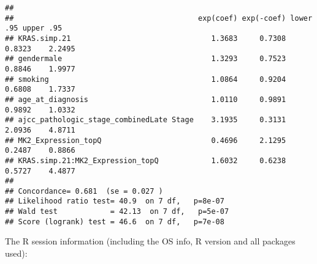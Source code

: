\documentclass{article}\usepackage[]{graphicx}\usepackage[]{color}
\makeatletter
\newenvironment{kframe}{%
 \def\at@end@of@kframe{}%
 \ifinner\ifhmode%
  \def\at@end@of@kframe{\end{minipage}}%
  \begin{minipage}{\columnwidth}%
 \fi\fi%
 \def\FrameCommand##1{\hskip\@totalleftmargin \hskip-\fboxsep
 \colorbox{shadecolor}{##1}\hskip-\fboxsep
     \hskip-\linewidth \hskip-\@totalleftmargin \hskip\columnwidth}%
 \MakeFramed {\advance\hsize-\width
   \@totalleftmargin\z@ \linewidth\hsize
   \@setminipage}}%
 {\par\unskip\endMakeFramed%
 \at@end@of@kframe}
\newenvironment{knitrout}{}{} %
\makeatother
\begin{document}
\begin{knitrout}
\begin{kframe}
\begin{verbatim}
## 
##                                          exp(coef) exp(-coef) lower .95 upper .95
## KRAS.simp.21                                1.3683     0.7308    0.8323    2.2495
## gendermale                                  1.3293     0.7523    0.8846    1.9977
## smoking                                     1.0864     0.9204    0.6808    1.7337
## age_at_diagnosis                            1.0110     0.9891    0.9892    1.0332
## ajcc_pathologic_stage_combinedLate Stage    3.1935     0.3131    2.0936    4.8711
## MK2_Expression_topQ                         0.4696     2.1295    0.2487    0.8866
## KRAS.simp.21:MK2_Expression_topQ            1.6032     0.6238    0.5727    4.4877
## 
## Concordance= 0.681  (se = 0.027 )
## Likelihood ratio test= 40.9  on 7 df,   p=8e-07
## Wald test            = 42.13  on 7 df,   p=5e-07
## Score (logrank) test = 46.6  on 7 df,   p=7e-08
\end{verbatim}
\end{kframe}
\end{knitrout}

The R session information (including the OS info, R version and all
packages used):
\end{document}
